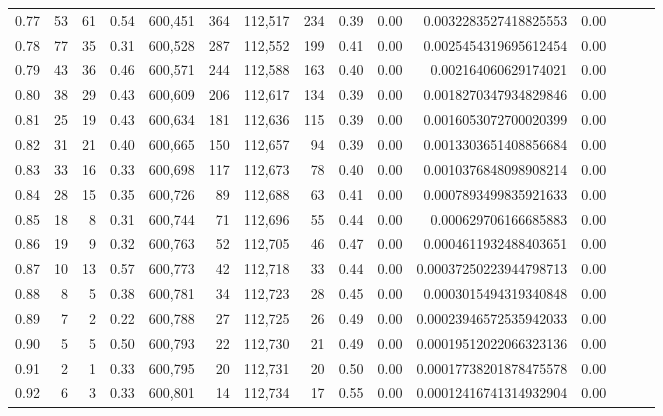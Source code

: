 \begin{tabular}{rrrrrrrrrrrrrrr}
0.77 &      53 &     61 &  0.54 &  600,451 &      364 &  112,517 &      234 &  0.39 &  0.00 &   0.0032283527418825553 &      0.00 \\
0.78 &      77 &     35 &  0.31 &  600,528 &      287 &  112,552 &      199 &  0.41 &  0.00 &   0.0025454319695612454 &      0.00 \\
0.79 &      43 &     36 &  0.46 &  600,571 &      244 &  112,588 &      163 &  0.40 &  0.00 &    0.002164060629174021 &      0.00 \\
0.80 &      38 &     29 &  0.43 &  600,609 &      206 &  112,617 &      134 &  0.39 &  0.00 &   0.0018270347934829846 &      0.00 \\
0.81 &      25 &     19 &  0.43 &  600,634 &      181 &  112,636 &      115 &  0.39 &  0.00 &   0.0016053072700020399 &      0.00 \\
0.82 &      31 &     21 &  0.40 &  600,665 &      150 &  112,657 &       94 &  0.39 &  0.00 &   0.0013303651408856684 &      0.00 \\
0.83 &      33 &     16 &  0.33 &  600,698 &      117 &  112,673 &       78 &  0.40 &  0.00 &   0.0010376848098908214 &      0.00 \\
0.84 &      28 &     15 &  0.35 &  600,726 &       89 &  112,688 &       63 &  0.41 &  0.00 &   0.0007893499835921633 &      0.00 \\
0.85 &      18 &      8 &  0.31 &  600,744 &       71 &  112,696 &       55 &  0.44 &  0.00 &    0.000629706166685883 &      0.00 \\
0.86 &      19 &      9 &  0.32 &  600,763 &       52 &  112,705 &       46 &  0.47 &  0.00 &   0.0004611932488403651 &      0.00 \\
0.87 &      10 &     13 &  0.57 &  600,773 &       42 &  112,718 &       33 &  0.44 &  0.00 &  0.00037250223944798713 &      0.00 \\
0.88 &       8 &      5 &  0.38 &  600,781 &       34 &  112,723 &       28 &  0.45 &  0.00 &   0.0003015494319340848 &      0.00 \\
0.89 &       7 &      2 &  0.22 &  600,788 &       27 &  112,725 &       26 &  0.49 &  0.00 &  0.00023946572535942033 &      0.00 \\
0.90 &       5 &      5 &  0.50 &  600,793 &       22 &  112,730 &       21 &  0.49 &  0.00 &  0.00019512022066323136 &      0.00 \\
0.91 &       2 &      1 &  0.33 &  600,795 &       20 &  112,731 &       20 &  0.50 &  0.00 &  0.00017738201878475578 &      0.00 \\
0.92 &       6 &      3 &  0.33 &  600,801 &       14 &  112,734 &       17 &  0.55 &  0.00 &  0.00012416741314932904 &      0.00 \\

\end{tabular}
